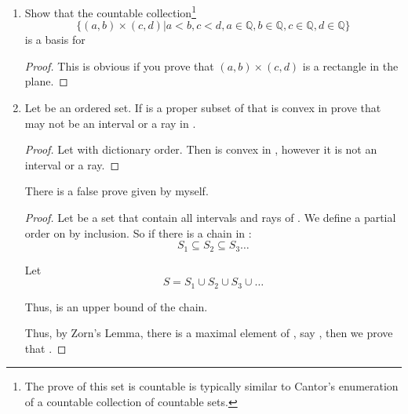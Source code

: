 \begin{enumerate}
      \item Show that the countable collection\footnote{
            The prove of this set is countable is typically similar to Cantor's enumeration of a countable collection of countable sets.
      }
      \begin{equation*}
            \{ 
                  (a,b) \times (c,d) | a < b, c < d, a \in \mathbb{Q}, b \in \mathbb{Q}, c \in \mathbb{Q}, d \in \mathbb{Q}
            \}
      \end{equation*}
      is a basis for 

      \begin{proof}
            This is obvious if you prove that $ (a,b) \times (c,d) $ is a rectangle in the  plane.
      \end{proof}

      \item Let  be an ordered set. If  is a proper subset of  that is convex in  prove that  may not be an interval or a ray in .
      
      \begin{proof}
            Let  with dictionary order. Then  is convex in , however it is not an interval or a ray.
      \end{proof}

      There is a false prove given by myself.

      \begin{proof}
            Let  be a set that contain all intervals and rays of . We define a partial order on  by inclusion. So if there is a chain in :
            \begin{equation*}
                  S_{1} \subseteq S_{2} \subseteq S_{3} \dots
            \end{equation*}

            Let 
            \begin{equation*}
                  S = S_{1} \cup S_{2} \cup S_{3} \cup \dots
            \end{equation*}

            Thus,  is an upper bound of the chain.

            Thus, by Zorn's Lemma, there is a maximal element of , say , then we prove that .


\end{proof}
\end{enumerate}
